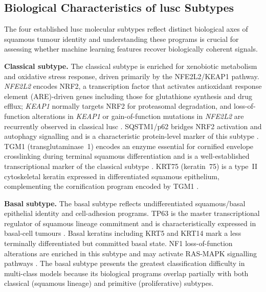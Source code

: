 \subsection{Biological Characteristics of \gls{lusc} Subtypes}


The four established \gls{lusc} molecular subtypes reflect distinct biological axes of squamous tumour identity and understanding these programs is crucial for assessing whether machine learning features recover biologically coherent signals.

\textbf{Classical subtype.}
The classical subtype is enriched for xenobiotic metabolism and oxidative stress response, driven primarily by the NFE2L2/KEAP1 pathway. \textit{NFE2L2} encodes NRF2, a transcription factor that activates antioxidant response element (ARE)-driven genes including those for glutathione synthesis and drug efflux; \textit{KEAP1} normally targets NRF2 for proteasomal degradation, and loss-of-function alterations in \textit{KEAP1} or gain-of-function mutations in \textit{NFE2L2} are recurrently observed in classical \gls{lusc} \parencite{Solis2012, Hammerman2012}. SQSTM1/p62 bridges NRF2 activation and autophagy signalling and is a characteristic protein-level marker of this subtype \parencite{Stewart2019}. TGM1 (transglutaminase~1) encodes an enzyme essential for cornified envelope crosslinking during terminal squamous differentiation and is a well-established transcriptional marker of the classical subtype \parencite{Wilkerson2010}. KRT75 (keratin~75) is a type~II cytoskeletal keratin expressed in differentiated squamous epithelium, complementing the cornification program encoded by TGM1 \parencite{Wilkerson2010, Hammerman2012}.


\textbf{Basal subtype.}
The basal subtype reflects undifferentiated squamous/basal epithelial identity and cell-adhesion programs. TP63 is the master transcriptional regulator of squamous lineage commitment and is characteristically expressed in basal-cell tumours \parencite{Wilkerson2010, Hammerman2012}. Basal keratins including KRT5 and KRT14 mark a less terminally differentiated but committed basal state. NF1 loss-of-function alterations are enriched in this subtype and may activate RAS-MAPK signalling pathways \parencite{Hammerman2012}. The basal subtype presents the greatest classification difficulty in multi-class models because its biological programs overlap partially with both classical (squamous lineage) and primitive (proliferative) subtypes.
 
